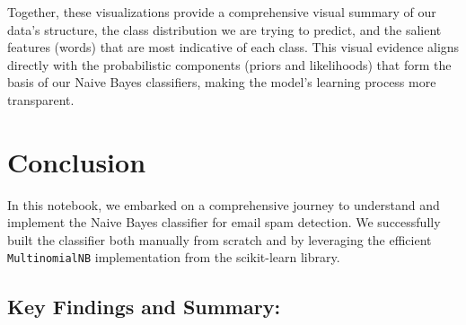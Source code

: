\documentclass[12pt,letterpaper]{article}
\begin{document}
Together, these visualizations provide a comprehensive visual summary of our data's structure, the class distribution we are trying to predict, and the salient features (words) that are most indicative of each class. This visual evidence aligns directly with the probabilistic components (priors and likelihoods) that form the basis of our Naive Bayes classifiers, making the model's learning process more transparent.

\section{Conclusion}

In this notebook, we embarked on a comprehensive journey to understand and implement the Naive Bayes classifier for email spam detection. We successfully built the classifier both manually from scratch and by leveraging the efficient \texttt{MultinomialNB} implementation from the scikit-learn library.

\subsection*{Key Findings and Summary:}
\end{document}
